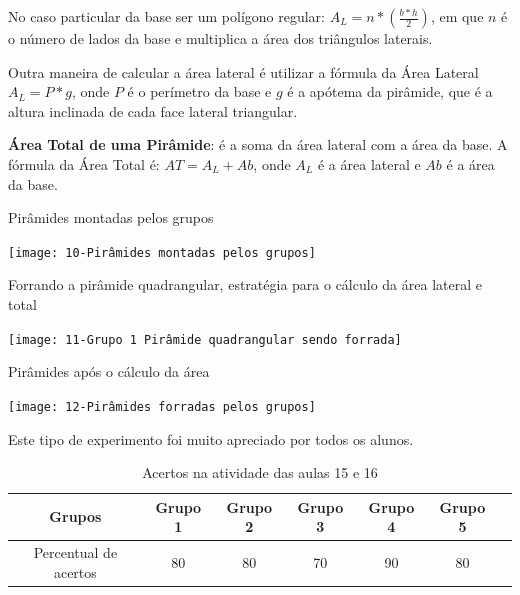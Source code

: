 No caso particular da base ser um polígono regular: $A_L = n * \left( \frac{b*h}{2}  \right)$, em que $n$ é o número de lados da base e multiplica a área dos triângulos laterais.

Outra maneira de calcular a área lateral é utilizar a fórmula da Área Lateral $A_L = P * g$, onde $P$ é o perímetro da base e $g$ é a apótema da pirâmide, que é a altura inclinada de cada face lateral triangular.

\textbf{Área Total de uma Pirâmide}: é a soma da área lateral com a área da base. A fórmula da Área Total é: $AT = A_L + Ab$, onde $A_L$ é a área lateral e $Ab$ é a área da base.

\begin{CenteredFigure}
    \caption{Pirâmides montadas pelos grupos} \label{fig:10-piramides montadas}
    \texttt{[image: 10-Pirâmides montadas pelos grupos]}
    \legend{\autoria}
\end{CenteredFigure}

\begin{CenteredFigure}
    \caption{Forrando a pirâmide quadrangular, estratégia para o cálculo da área lateral e total} \label{fig:11-grupo 1 forrando}
    \texttt{[image: 11-Grupo 1 Pirâmide quadrangular sendo forrada]}
    \legend{\autoria}
\end{CenteredFigure}

\begin{CenteredFigure}
    \caption{Pirâmides após o cálculo da área} \label{fig:12-piramides forradas}
    \texttt{[image: 12-Pirâmides forradas pelos grupos]}
    \legend{\autoria}
\end{CenteredFigure}

Este tipo de experimento foi muito apreciado por todos os alunos.

\begin{table}[htbp] \centering
    \caption{Acertos na atividade das aulas 15 e 16} \label{tab:Acertos do Encontro 8}

    \begin{tabular}{|c|c|c|c|c|c|c|}
        \hline
        \textbf{Grupos}       & \textbf{Grupo 1} & \textbf{Grupo 2} & \textbf{Grupo 3} & \textbf{Grupo 4} & \textbf{Grupo 5} \\
        \hline
        Percentual de acertos & 80               & 80               & 70               & 90               & 80               \\
        \hline
    \end{tabular}
    \legend{\legendaTabela}
\end{table}

